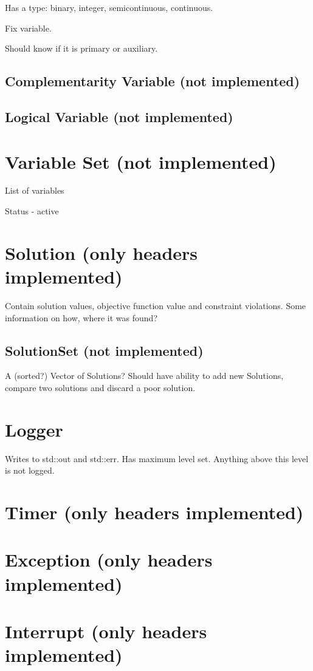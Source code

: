 \documentclass[10pt]{report}
\newcommand{\notimpl}[0]{(not implemented)}
\newcommand{\honly}[0]{(only headers implemented)}
\begin{document}
Has a type: binary, integer, semicontinuous, continuous.

Fix variable.

Should know if it is primary or auxiliary.

\subsection{Complementarity Variable \notimpl}

\subsection{Logical Variable \notimpl}

\section{Variable Set \notimpl}

  List of variables

  Status - active

\section{Solution \honly}
Contain solution values, objective function value and constraint violations.
Some information on how, where it was found?

\subsection{SolutionSet \notimpl}
A (sorted?) Vector of Solutions? Should have ability to add new Solutions,
compare two solutions and discard a poor solution.

\section{Logger}
Writes to std::out and std::err. Has maximum level set. Anything above this
level is not logged.

\section{Timer \honly}


\section{Exception \honly}

\section{Interrupt \honly}
\end{document}

